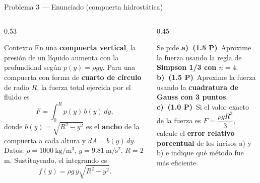 \documentclass[aspectratio=169,10pt]{beamer}
\begin{document}
\begin{frame}{Problema 3 — Enunciado (compuerta hidrostática)}
\begin{columns}[T]
\begin{column}{0.53\textwidth}
\begin{cardidea}{Contexto}{\faWater}
{\footnotesize En una \textbf{compuerta vertical}, la presión de un líquido aumenta con la profundidad según $p(y)=\rho g y$. Para una compuerta con forma de \textbf{cuarto de círculo} de radio $R$, la fuerza total ejercida por el fluido es
\[
F=\int_0^R p(y)\,b(y)\,dy,
\]
donde $b(y)=\sqrt{R^2-y^2}$ es el \textbf{ancho} de la compuerta a cada altura y $dA=b(y)\,dy$. Datos: $\rho=1000\ \mathrm{kg/m^3}$, $g=9.81\ \mathrm{m/s^2}$, $R=2$ m. Sustituyendo, el integrando es
\[
f(y)=\rho g\,y\sqrt{R^2-y^2}.
\]}
\end{cardidea}
\end{column}
\begin{column}{0.45\textwidth}
\begin{cardidea}{Se pide}{\faTasks}
{\footnotesize
\textbf{a)\ (1.5 P)}\ Aproxime la fuerza usando la regla de \textbf{Simpson 1/3 con $n=4$}.\\[1.4mm]
\textbf{b)\ (1.5 P)}\ Aproxime la fuerza usando la \textbf{cuadratura de Gauss con 3 puntos}.\\[1.4mm]
\textbf{c)\ (1.0 P)}\ Si el valor exacto de la fuerza es $F=\dfrac{\rho g R^3}{3}$, calcule el \textbf{error relativo porcentual} de los incisos a) y b) e indique qué método fue más eficiente.}
\end{cardidea}
\end{column}
\end{columns}
\end{frame}
\end{document}
